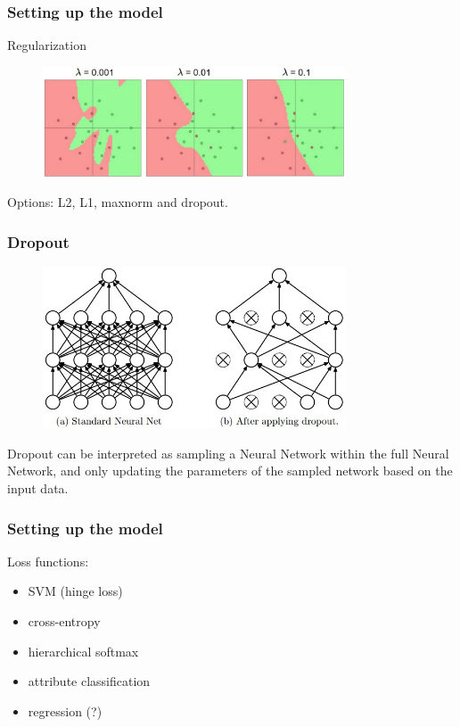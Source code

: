 \begin{frame}
        \frametitle{Setting up the model}

	Regularization

        \begin{figure}
                \includegraphics[width=0.8\textwidth]{Pics/reg_strengths}
        \end{figure}

        Options: L2, L1, maxnorm and dropout.

\end{frame}

\begin{frame}
	\frametitle{Dropout}

	\begin{figure}
                \includegraphics[width=0.8\textwidth]{Pics/dropout}
        \end{figure}

	Dropout can be interpreted as sampling a Neural Network within the full Neural Network, 
	and only updating the parameters of the sampled network based on the input data. 


\end{frame}


\begin{frame}
        \frametitle{Setting up the model}

        Loss functions:
	\begin{itemize}
                \item SVM (hinge loss)
                \item cross-entropy
                \item hierarchical softmax
                \item attribute classification
		\item regression (?)
        \end{itemize}

\end{frame}

